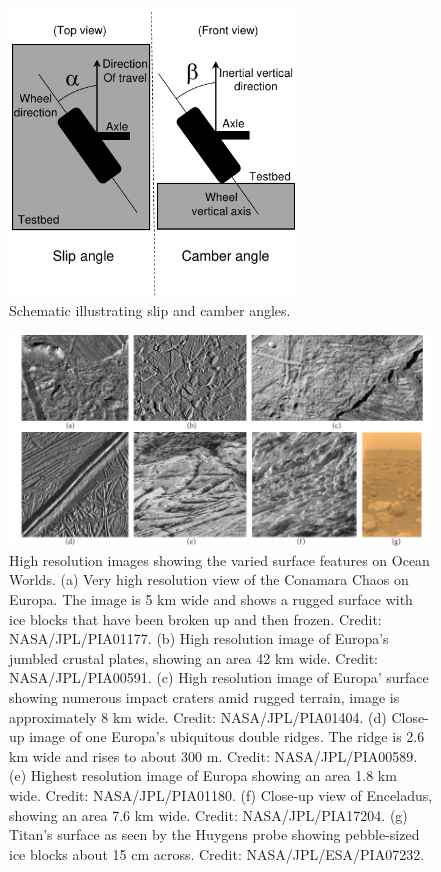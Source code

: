 \documentclass{article}
\begin{document}
\begin{figure}[hbt!]
\centering
\includegraphics[width=3.00in]{general-images/slip-camber-schematic.pdf}
\caption{Schematic illustrating slip and camber angles.}
\label{fig:slip-camber-schmatic}
\end{figure}

\begin{figure}[hbt!]
\centering
\includegraphics[width=6.5in]{general-images/icy-moon-surfaces.pdf}
\caption{High resolution images showing the varied surface features on Ocean Worlds. (a) Very high resolution view of the Conamara Chaos on Europa. The image is 5 km wide and shows a rugged surface with ice blocks that have been broken up and then frozen. Credit: NASA/JPL/PIA01177. (b) High resolution image of Europa's jumbled crustal plates, showing an area 42 km wide. Credit: NASA/JPL/PIA00591. (c) High resolution image of Europa' surface showing numerous impact craters amid rugged terrain, image is approximately 8 km wide. Credit: NASA/JPL/PIA01404. (d) Close-up image of one Europa's ubiquitous double ridges. The ridge is 2.6 km wide and rises to about 300 m. Credit: NASA/JPL/PIA00589. (e) Highest resolution image of Europa showing an area 1.8 km wide. Credit: NASA/JPL/PIA01180. (f) Close-up view of Enceladus, showing an area 7.6 km wide. Credit: NASA/JPL/PIA17204. (g) Titan's surface as seen by the Huygens probe showing pebble-sized ice blocks about 15 cm across. Credit: NASA/JPL/ESA/PIA07232.}
\label{fig:icy-moon-photos-and-earth-analogs}
\end{figure}
\end{document}
